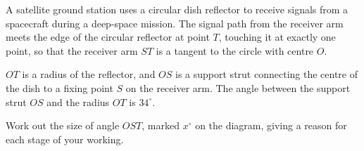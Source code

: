 \documentclass{article}
\begin{document}
\begin{preview}
\begin{question}
\noindent A satellite ground station uses a circular dish reflector to receive signals from a spacecraft during a deep-space mission. The signal path from the receiver arm meets the edge of the circular reflector at point $T$, touching it at exactly one point, so that the receiver arm $ST$ is a tangent to the circle with centre $O$.

$OT$ is a radius of the reflector, and $OS$ is a support strut connecting the centre of the dish to a fixing point $S$ on the receiver arm. The angle between the support strut $OS$ and the radius $OT$ is $34^\circ$.

\begin{center}
\end{center}

\noindent Work out the size of angle $OST$, marked $x^\circ$ on the diagram, giving a reason for each stage of your working.

\vspace{5cm}

\begin{flushright}
\end{flushright}
\end{question}

\end{preview}
\end{document}
